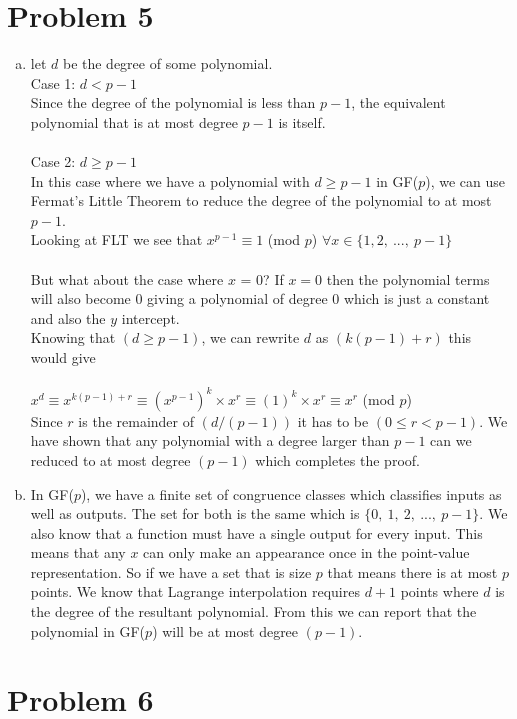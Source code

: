 \documentclass[11pt,letterpaper]{article}
\begin{document}
\section*{Problem 5}
\begin{enumerate}[(a)]
\item
let $d$ be the degree of some polynomial.\\
Case 1: $d < p-1$\\
Since the degree of the polynomial is less than $p-1$, the equivalent polynomial that is at most degree $p-1$ is itself.\\\\
Case 2: $d\geq p-1$\\
In this case where we have a polynomial with $d\geq p-1$ in GF($p$), we can use Fermat's Little Theorem to reduce the degree of the polynomial to at most $p-1$.\\
Looking at FLT we see that $x^{p-1} \equiv 1$ (mod $p$) $\forall x \in \{1,2,~...,~p-1\}$\\
\\
But what about the case where $x$ = 0? If $x=0$ then the polynomial terms will also become 0 giving a polynomial of degree 0 which is just a constant and also the $y$ intercept.\\
Knowing that $(d\geq p-1)$, we can rewrite $d$ as $(k(p-1)+r)$ this would give\\\\
$x^d \equiv x^{k(p-1) +r} \equiv (x^{p-1})^k \times x^{r} \equiv (1)^k \times x^r \equiv x^r$ (mod $p$)\\
Since $r$ is the remainder of $(d/(p-1))$ it has to be $(0\leq r < p-1)$. We have shown that any polynomial with a degree larger than $p-1$ can we reduced to at most degree $(p-1)$ which completes the proof.
\item
In GF($p$), we have a finite set of congruence classes which classifies inputs as well as outputs. The set for both is the same which is $\{0,~1,~2,~...,~p-1\}$. We also know that a function must have a single output for every input. This means that any $x$ can only make an appearance once in the point-value representation. So if we have a set that is size $p$ that means there is at most $p$ points. We know that Lagrange interpolation requires $d+1$ points where $d$ is the degree of the resultant polynomial. From this we can report that the polynomial in GF($p$) will be at most degree $(p-1)$.
\end{enumerate}
\clearpage
\section*{Problem 6}
\end{document}
